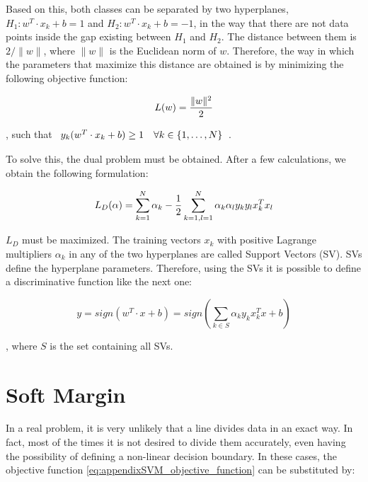 Based on this, both classes can be separated by two hyperplanes, $H_1: w^T \cdot x_k + b = 1$ and $H_2: w^T \cdot x_k + b = -1$, in the way that there are not data points inside the gap existing between $H_1$ and $H_2$. The distance between them is $2 / \|w\|$, where $\|w\|$ is the Euclidean norm of $w$. Therefore, the way in which the parameters that maximize this distance are obtained is by minimizing the following objective function:

\begin{equation}\label{eq:appendixSVM_objective_function}
 L(w) = {{\|w\|^2} \over 2}
\end{equation}

, such that $\begin{array}{l r} 
y_k (w^T \cdot x_k + b) \geq 1 & \forall k \in \{1, \dots, N \}
\end{array} $.

To solve this, the dual problem must be obtained. After a few calculations, we obtain the following formulation:

\begin{equation}\label{eq:appendixSVM_dual_formulation}
 L_D (\alpha) = \sum_{k=1}^N \alpha_k - {1 \over 2} \sum_{k = 1, l=1}^N \alpha_k \alpha_l y_k y_l x_k^T x_l
\end{equation}

$L_D$ must be maximized. The training vectors $x_k$ with positive Lagrange multipliers $\alpha_k$ in any of the two hyperplanes are called Support Vectors (SV). SVs define the hyperplane parameters. Therefore, using the SVs it is possible to define a discriminative function like the next one: 

\begin{equation}\label{eq:appendixSVM_discriminative_function}
 y = sign(w^T \cdot x + b) = sign \left(\sum_{k \in S} \alpha_k y_k x_k^T x + b \right)
\end{equation}

, where $S$ is the set containing all SVs.

\section{Soft Margin}\label{ch:appendixSVM_02}

In a real problem, it is very unlikely that a line divides data in an exact way. In fact, most of the times it is not desired to divide them accurately, even having the possibility of defining a non-linear decision boundary. 
In these cases, the objective function \ref{eq:appendixSVM_objective_function} can be substituted by:

